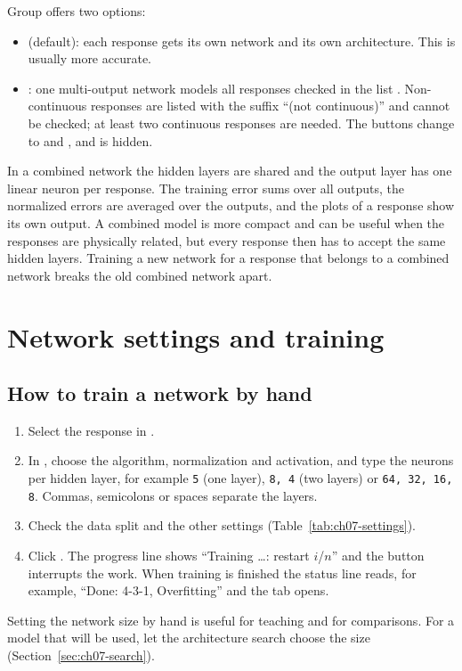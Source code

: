 Group  offers two options:
\begin{itemize}
  \item {} (default): each response gets its own network and its own
    architecture. This is usually more accurate.
  \item {}: one multi-output network models all responses checked
    in the list . Non-continuous responses are listed with the suffix
    ``(not continuous)'' and cannot be checked; at least two continuous responses are needed. The buttons change
    to  and , and  is hidden.
\end{itemize}
In a combined network the hidden layers are shared and the output layer has one linear neuron per response. The
training error sums over all outputs, the normalized errors are averaged over the outputs, and the plots of a
response show its own output. A combined model is more compact and can be useful when the responses are
physically related, but every response then has to accept the same hidden layers. Training a new network for a
response that belongs to a combined network breaks the old combined network apart.

\section{Network settings and training}\label{sec:ch07-training}

\subsection{How to train a network by hand}

\begin{enumerate}
  \item Select the response in .
  \item In , choose the algorithm, normalization and activation, and type the neurons per
    hidden layer, for example \texttt{5} (one layer), \texttt{8, 4} (two layers) or \texttt{64, 32, 16, 8}.
    Commas, semicolons or spaces separate the layers.
  \item Check the data split and the other settings (Table~\ref{tab:ch07-settings}).
  \item Click . The progress line shows ``Training \dots: restart $i$/$n$'' and the
     button interrupts the work. When training is finished the status line reads, for example, ``Done:
    4-3-1, Overfitting'' and the  tab opens.
\end{enumerate}
Setting the network size by hand is useful for teaching and for comparisons. For a model that will be used,
let the architecture search choose the size (Section~\ref{sec:ch07-search}).

